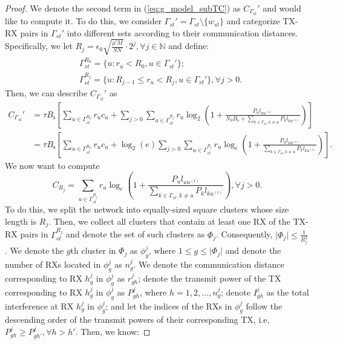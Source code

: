 \documentclass[journal,draftclsnofoot,onecolumn,12pt,twoside]{IEEEtran}
\begin{document}
\begin{proof}
We denote the second term in (\ref{eq:g_model_subTC}) as $C_{\Gamma_{st}}'$ and would like to compute it. To do this, we consider $\Gamma_{st}'=\Gamma_{st}\setminus\lbrace w_{st} \rbrace$ and categorize TX-RX pairs in $\Gamma_{st}'$ into different sets according to their communication distances. Specifically, we let $R_j=\epsilon_0\sqrt{\frac{\rho'M}{SN}}\cdot 2^j,\forall j\in\mathbb{N}$ and define:
\begin{equation}
\begin{aligned}
&\Gamma^{R_0}_{st}=\lbrace u: r_u< R_0,u\in \Gamma_{st}'\rbrace;\\
&\Gamma^{R_j}_{st}=\lbrace u: R_{j-1}\leq r_u< R_j,u\in \Gamma_{st}'\rbrace,\forall j>0.
\end{aligned}
\end{equation}
Then, we can describe $C_{\Gamma_{st}}'$ as
\begin{equation}
\begin{aligned}\label{eq:g_model_subTC_1}
C_{\Gamma_{st}}'&=\tau B_{\text{s}}\left[\sum_{u\in\Gamma^{R_0}_{st}}r_uc_u+\sum_{j>0}\sum_{u\in\Gamma_{st}^{R_j}}r_u\log_2\left(1+\frac{P_ul_{uu^{(\text{r})}}}{N_0B_{\text{s}}+\sum_{k\in\Gamma_{st},k\neq u}P_kl_{ku^{(\text{r})}}}\right)\right]\\
&=\tau B_{\text{s}}\left[\sum_{u\in\Gamma^{R_0}_{st}}r_uc_u+\log_2(e)\sum_{j>0}\sum_{u\in\Gamma_{st}^{R_j}}r_u\log_e\left(1+\frac{P_ul_{uu^{(\text{r})}}}{\sum_{k\in\Gamma_{st},k\neq u}P_kl_{ku^{(\text{r})}}}\right)\right].
\end{aligned}
\end{equation}
We now want to compute 
\begin{equation}
C_{R_j}=\sum_{u\in\Gamma_{st}^{R_j}}r_u\log_e\left(1+\frac{P_ul_{uu^{(\text{r})}}}{\sum_{k\in\Gamma_{st},k\neq u}P_kl_{ku^{(\text{r})}}}\right),\forall j>0.
\end{equation}
To do this, we split the network into equally-sized square clusters whose size length is $R_j$. Then, we collect all clusters that contain at least one RX of the TX-RX pairs in $\Gamma^{R_j}_{st}$ and denote the set of such clusters as $\Phi_j$. Consequently, $\vert\Phi_j\vert\leq \frac{1}{R_j^2}$. We denote the $g$th cluster in $\Phi_j$ as $\phi_g^j$, where $1\leq g\leq \vert\Phi_j\vert$ and denote the number of RXs located in $\phi_g^j$ as $n_g^j$. We denote the communication distance corresponding to RX $h_g^j$ in $\phi_g^j$ as $r_{gh}^j$; denote the transmit power of the TX corresponding to RX $h_g^j$ in $\phi_g^j$ as $P_{gh}^j$, where $h=1,2,...,n_{g}^j$; denote $I_{gh}^j$ as the total interference at RX $h_g^j$ in $\phi_g^j$; and let the indices of the RXs in $\phi_g^j$ follow the descending order of the transmit powers of their corresponding TX, i.e, $P_{gh}^j\geq P_{gh'}^j,\forall h> h'$. Then, we know:

\end{proof}
\end{document}
